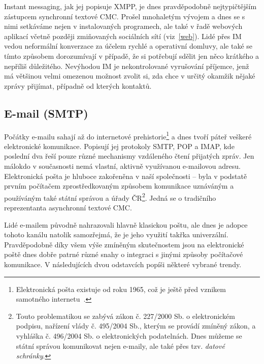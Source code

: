 \documentclass[12pt,oneside,final]{fithesis2}
\begin{document}
Instant messaging, jak jej popisuje XMPP, je dnes pravděpodobně nejtypičtějším zástupcem synchronní textové CMC. Prošel mnohaletým vývojem a dnes se s nimi setkáváme nejen v instalovaných programech, ale také v řadě webových aplikací včetně později zmiňovaných sociálních sítí (viz~\ref{web}). Lidé přes IM vedou neformální konverzace za účelem rychlé a operativní domluvy, ale také se tímto způsobem dorozumívají v případě, že si potřebují sdělit jen něco krátkého a nepříliš důležitého. Nevýhodou IM je nekontrolované vyrušování příjemce, jenž má většinou velmi omezenou možnost zvolit si, zda chce v určitý okamžik nějaké zprávy přijímat, případně od kterých kontaktů.

\subsection{E-mail (SMTP)}\label{email}
Počátky e-mailu sahají až do internetové prehistorie\footnote{Elektronická pošta existuje od roku 1965, což je ještě před vznikem samotného internetu~\cite{vanvleck2012electronic}.} a dnes tvoří páteř veškeré elektronické komunikace. Popisují jej protokoly SMTP, POP a IMAP, kde poslední dva řeší pouze různé mechanismy vzdáleného čtení přijatých zpráv. Jen málokdo v současnosti nemá vlastní, aktivně využívanou e-mailovou adresu. Elektronická pošta je hluboce zakořeněna v naší společnosti -- byla v podstatě prvním počítačem zprostředkovaným způsobem komunikace uznáváným a používáným také státní správou a úřady ČR\footnote{Touto problematikou se zabývá zákon č. 227/2000 Sb. o elektronickém podpisu, nařízení vlády č. 495/2004 Sb., kterým se provádí zmíněný zákon, a vyhláška č. 496/2004 Sb. o elektronických podatelnách. Dnes můžeme se státní správou komunikovat nejen e-maily, ale také přes tzv. \emph{datové schránky}.}. Jedná se o tradičního reprezentanta asynchronní textové CMC.

Lidé e-mailem původně nahrazovali hlavně klasickou poštu, ale dnes je adopce tohoto kanálu natolik samozřejmá, že je jeho využití takřka univerzální. Pravděpodobně díky všem výše zmíněným skutečnostem jsou na elektronické poště dnes dobře patrné různé snahy o integraci s jinými způsoby počítačové komunikace. V následujících dvou odstavcích popíši některé vybrané trendy.
\end{document}
